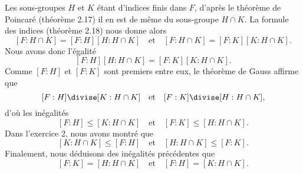 Les sous-groupes $H$ et $K$ étant d'indices finis dans $F$, d'après le théorème
de Poincaré (théorème 2.17) il en est de même du sous-groupe $H\cap K$.
La formule des indices (théorème 2.18) nous donne alors
\[
  [F:H\cap K] = [F:H][H:H\cap K]
  \quad\text{et}\quad
  [F:H\cap K] = [F:K][K:H\cap K].
\]
Nous avons donc l'égalité
\[
  [F:H][H:H\cap K] = [F:K][K:H\cap K].
\]
Comme $[F:H]$ et $[F:K]$ sont premiers entre eux, le théorème de Gauss affirme
que
\[
  [F:H] \divise [K:H\cap K]
  \quad\text{et}\quad
  [F:K] \divise [H:H\cap K],
\]
d'où les inégalités
\[
  [F:H] \leq [K:H\cap K]
  \quad\text{et}\quad
  [F:K] \leq [H:H\cap K].
\]
Dans l'exercice 2, nous avons montré que
\[
  [K:H\cap K]\leq [F:H]
  \quad\text{et}\quad
  [H:H\cap K]\leq [F:K].
\]
Finalement, nous déduisons des inégalités précédentes que
\[
  [F:K] = [H:H\cap K]
  \quad\text{et}\quad
  [F:H] = [K:H\cap K].
\]
